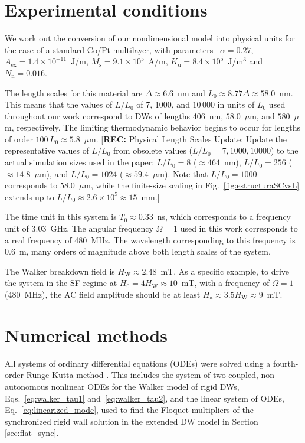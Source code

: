 \documentclass[prb,aps,twocolumn,superscriptaddress,floatfix]{revtex4-1}
\newcommand{\rec}[1]{{\color{magenta}[\textbf{REC:} #1]}}
\begin{document}
\appendix

\section{Experimental conditions}
\label{ap:exp_cond}

We work out the conversion of our nondimensional model into physical units for the case of a standard Co/Pt multilayer, with parameters~\cite{skaugen2019} $\alpha=0.27$, $A_\text{ex}=1.4 \times 10^{-11}$~J/m, $M_\text{s}=9.1\times 10^5$~A/m, $K_\text{u}=8.4\times 10 ^5$~J/m$^3$ and $N_\text{n}=0.016$.

The length scales for this material are $\Delta\approx6.6$~nm and $L_0\approx8.77\Delta\approx58.0$~nm. This means that the values of $L/L_0$ of 7, 1000, and $10\,000$ in units of $L_0$ used throughout our work correspond to DWs of lengths 406~nm, $58.0$~$\mu$m, and $580$~$\mu$m, respectively. The limiting thermodynamic behavior begins to occur for lengths of order $100\, L_0\approx5.8$~$\mu$m.
\rec{Physical Length Scales Update: Update the representative values of $L/L_0$ from obsolete values ($L/L_0=7, 1000, 10000$) to the actual simulation sizes used in the paper: $L/L_0=8$ ($\approx 464$~nm), $L/L_0=256$ ($\approx 14.8$~$\mu$m), and $L/L_0=1024$ ($\approx 59.4$~$\mu$m). Note that $L/L_0=1000$ corresponds to $58.0$~$\mu$m, while the finite-size scaling in Fig.~\ref{fig:estructuraSCvsL} extends up to $L/L_0 \approx 2.6\times 10^5 \approx 15$~mm.}

The time unit in this system is $T_0 \approx0.33$~ns, which corresponds to a frequency unit of $3.03$~GHz. The angular frequency $\Omega=1$ used in this work corresponds to a real frequency of 480~MHz. The wavelength corresponding to this frequency is $0.6$~m, many orders of magnitude above both length scales of the system. 

The Walker breakdown field is $H_\text{W}\approx2.48$~mT. As a specific example, to drive the system in the SF regime at $H_0=4H_\text{W}\approx10$~mT, with a frequency of $\Omega=1$ (480~MHz), the AC field amplitude should be at least $H_\text{a}\approx3.5H_\text{W}\approx9$~mT.

\section{Numerical methods}
\label{ap:num_met}

All systems of ordinary differential equations (ODEs) were solved using a fourth-order Runge-Kutta method \cite{press2007numerical}. This includes the system of two coupled, non-autonomous nonlinear ODEs for the Walker model of rigid DWs, Eqs.~\eqref{eq:walker_tau1} and~\eqref{eq:walker_tau2}, and the linear system of ODEs, Eq.~\eqref{eq:linearized_mode}, used to find the Floquet multipliers of the synchronized rigid wall solution in the extended DW model in Section \ref{sec:flat_sync}.
\end{document}
